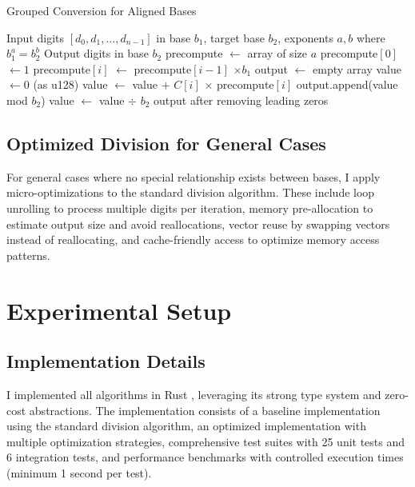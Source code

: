 \documentclass[10pt]{article}
\begin{document}
\begin{algorithm}
\caption{Grouped Conversion for Aligned Bases}
\begin{algorithmic}[1]
\REQUIRE Input digits $[d_0, d_1, ..., d_{n-1}]$ in base $b_1$, target base $b_2$, exponents $a, b$ where $b_1^a = b_2^b$
\ENSURE Output digits in base $b_2$
\STATE precompute $\gets$ array of size $a$
\STATE precompute$[0]$ $\gets 1$
  \STATE precompute$[i]$ $\gets$ precompute$[i-1]$ $\times b_1$
\ENDFOR
\STATE output $\gets$ empty array
  \STATE value $\gets 0$ (as u128)
    \STATE value $\gets$ value $+$ $C[i]$ $\times$ precompute$[i]$
  \ENDFOR
    \STATE output.append(value mod $b_2$)
    \STATE value $\gets$ value $\div$ $b_2$
  \ENDFOR
\ENDFOR
\RETURN output after removing leading zeros
\end{algorithmic}
\end{algorithm}

\subsection{Optimized Division for General Cases}

For general cases where no special relationship exists between bases, I apply micro-optimizations to the standard division algorithm. These include loop unrolling to process multiple digits per iteration, memory pre-allocation to estimate output size and avoid reallocations, vector reuse by swapping vectors instead of reallocating, and cache-friendly access to optimize memory access patterns.

\section{Experimental Setup}

\subsection{Implementation Details}

I implemented all algorithms in Rust \cite{rust2023}, leveraging its strong type system and zero-cost abstractions. The implementation consists of a baseline implementation using the standard division algorithm, an optimized implementation with multiple optimization strategies, comprehensive test suites with 25 unit tests and 6 integration tests, and performance benchmarks with controlled execution times (minimum 1 second per test).
\end{document}
